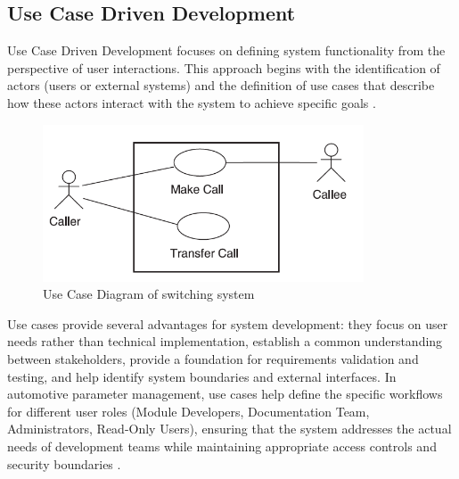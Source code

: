 

\subsection{Use Case Driven Development}
\label{subsec:use-case-driven-development}

Use Case Driven Development focuses on defining system functionality from the perspective of user interactions. This approach begins with the identification of actors (users or external systems) and the definition of use cases that describe how these actors interact with the system to achieve specific goals \cite{jacobson2004use}.

\begin{figure}[ht]
    \centering
    \includegraphics[width=0.85\textwidth]{figures/use_case_diagram.png}
    \caption{Use Case Diagram of switching system \cite{jacobson2004use}}
    \label{fig:use-case-diagram}
\end{figure}

Use cases provide several advantages for system development: they focus on user needs rather than technical implementation, establish a common understanding between stakeholders, provide a foundation for requirements validation and testing, and help identify system boundaries and external interfaces. In automotive parameter management, use cases help define the specific workflows for different user roles (Module Developers, Documentation Team, Administrators, Read-Only Users), ensuring that the system addresses the actual needs of development teams while maintaining appropriate access controls and security boundaries \cite{sandhu1998role}.

